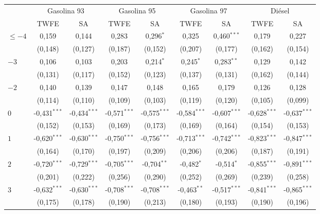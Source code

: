 \begin{tabular}{lcccccccc}
\toprule
 & \multicolumn{2}{c}{Gasolina 93} & \multicolumn{2}{c}{Gasolina 95} & \multicolumn{2}{c}{Gasolina 97} & \multicolumn{2}{c}{Diésel} \\
\cmidrule(lr){2-3} \cmidrule(lr){4-5} \cmidrule(lr){6-7} \cmidrule(lr){8-9}
 & TWFE & SA & TWFE & SA & TWFE & SA & TWFE & SA \\
\midrule
$\leq -4$ & 0{,}159 & 0{,}144 & 0{,}283 & 0{,}296$^{*}$ & 0{,}325 & 0{,}460$^{***}$ & 0{,}179 & 0{,}227 \\
 & (0{,}148) & (0{,}127) & (0{,}187) & (0{,}152) & (0{,}207) & (0{,}177) & (0{,}162) & (0{,}154) \\
$-3$ & 0{,}106 & 0{,}103 & 0{,}203 & 0{,}214$^{*}$ & 0{,}245$^{*}$ & 0{,}283$^{**}$ & 0{,}129 & 0{,}142 \\
 & (0{,}131) & (0{,}117) & (0{,}152) & (0{,}123) & (0{,}137) & (0{,}131) & (0{,}162) & (0{,}144) \\
$-2$ & 0{,}140 & 0{,}139 & 0{,}147 & 0{,}148 & 0{,}165 & 0{,}179 & 0{,}126 & 0{,}128 \\
 & (0{,}114) & (0{,}110) & (0{,}109) & (0{,}103) & (0{,}119) & (0{,}120) & (0{,}105) & (0{,}099) \\
$0$ & -0{,}431$^{***}$ & -0{,}434$^{***}$ & -0{,}571$^{***}$ & -0{,}575$^{***}$ & -0{,}584$^{***}$ & -0{,}607$^{***}$ & -0{,}628$^{***}$ & -0{,}637$^{***}$ \\
 & (0{,}152) & (0{,}153) & (0{,}169) & (0{,}173) & (0{,}169) & (0{,}164) & (0{,}154) & (0{,}153) \\
$1$ & -0{,}620$^{***}$ & -0{,}630$^{***}$ & -0{,}750$^{***}$ & -0{,}756$^{***}$ & -0{,}713$^{***}$ & -0{,}742$^{***}$ & -0{,}823$^{***}$ & -0{,}847$^{***}$ \\
 & (0{,}164) & (0{,}170) & (0{,}197) & (0{,}209) & (0{,}206) & (0{,}206) & (0{,}187) & (0{,}191) \\
$2$ & -0{,}720$^{***}$ & -0{,}729$^{***}$ & -0{,}705$^{***}$ & -0{,}704$^{**}$ & -0{,}482$^{*}$ & -0{,}514$^{*}$ & -0{,}855$^{***}$ & -0{,}891$^{***}$ \\
 & (0{,}201) & (0{,}222) & (0{,}256) & (0{,}290) & (0{,}252) & (0{,}269) & (0{,}239) & (0{,}258) \\
$3$ & -0{,}632$^{***}$ & -0{,}630$^{***}$ & -0{,}708$^{***}$ & -0{,}708$^{***}$ & -0{,}463$^{**}$ & -0{,}517$^{***}$ & -0{,}841$^{***}$ & -0{,}865$^{***}$ \\
 & (0{,}175) & (0{,}178) & (0{,}190) & (0{,}213) & (0{,}180) & (0{,}193) & (0{,}190) & (0{,}196) \\

\end{tabular}

